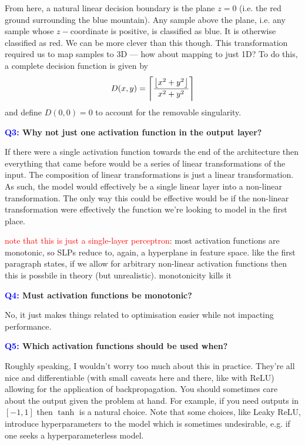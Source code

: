 \documentclass[11pt]{article}
\begin{document}
From here, a natural linear decision boundary is the plane $z=0$ (i.e. the red ground surrounding the blue mountain). Any sample above the plane, i.e. any sample whose $z-$coordinate is positive, is classified as blue. It is otherwise classified as red. We can be more clever than this though. This transformation required us to map samples to 3D — how about mapping to just 1D? To do this, a complete decision function is given by
$$
D(x,y)=\left\lceil\frac{\left\lfloor x^2+y^2\right\rfloor}{x^2+y^2}\right\rceil
$$
and define $D(0,0)=0$ to account for the removable singularity.

\begin{center}
    \textbf{\textcolor{blue}{Q3:} Why not just one activation function in the output layer?}
\end{center}
If there were a single activation function towards the end of the architecture then everything that came before would be a series of linear transformations of the input. The composition of linear transformations is just a linear transformation. As such, the model would effectively be a single linear layer into a non-linear transformation. The only way this could be effective would be if the non-linear transformation were effectively the function we're looking to model in the first place.

\textcolor{red}{note that this is just a single-layer perceptron}: most activation functions are monotonic, so SLPs reduce to, again, a hyperplane in feature space. like the first paragraph states, if we allow for arbitrary non-linear activation functions then this is possbile in theory (but unrealistic). monotonicity kills it

\begin{center}
    \textbf{\textcolor{blue}{Q4:} Must activation functions be monotonic?}
\end{center}
No, it just makes things related to optimisation easier while not impacting performance.

\begin{center}
    \textbf{\textcolor{blue}{Q5:} Which activation functions should be used when?}
\end{center}
Roughly speaking, I wouldn't worry too much about this in practice. They're all nice and differentiable (with small caveats here and there, like with ReLU) allowing for the application of backpropagation. You should sometimes care about the output given the problem at hand. For example, if you need outputs in $[-1,1]$ then $\tanh$ is a natural choice. Note that some choices, like Leaky ReLU, introduce hyperparameters to the model which is sometimes undesirable, e.g. if one seeks a hyperparameterless model.
\end{document}
